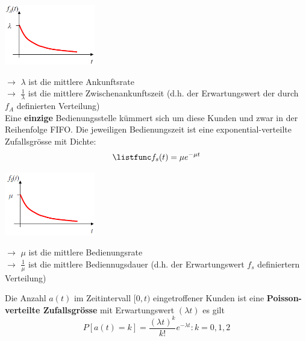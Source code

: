 \documentclass{report}
\newenvironment{Figure}
	{\par\medskip\noindent\minipage{\linewidth}}
	{\endminipage\par\medskip}
\theoremstyle{definition}
\theoremstyle{example}
\begin{document}
\begin{Figure}
\centering
\includegraphics[width=150px]{img/MM1Graph.png}
	\label{fig:Funktion MM1}
\end{Figure}
$\rightarrow$ $\lambda$ ist die mittlere Ankunftsrate \\
$\rightarrow$ $\frac{1}{\lambda}$ ist die mittlere Zwischenankunftszeit (d.h. der Erwartungswert der durch $f_A$ definierten Verteilung)\\

Eine \textbf{einzige} Bedienungsstelle kümmert sich um diese Kunden und zwar in der Reihenfolge FIFO. Die jeweiligen Bedienungszeit ist eine exponential-verteilte Zufallsgrösse mit Dichte:
\begin{equation}
   \listfunc f_s(t) = \mu e^{- \mu t}
\end{equation}

\begin{Figure}
\centering
\includegraphics[width=150px]{img/midBedienungsrate.png}
	\label{fig:Funktion mittlere Bedienungsrate}
\end{Figure}
$\rightarrow$ $\mu$ ist die mittlere Bedienungsrate\\
$\rightarrow$ $\frac{1}{\mu}$ ist die mittlere Bediennugsdauer (d.h. der Erwartungswert $f_s$ definiertern Verteilung)

Die Anzahl $a(t)$ im Zeitintervall $[0,t)$ eingetroffener Kunden ist eine \textbf{Poisson-verteilte Zufallsgrösse} mit Erwartungswert $(\lambda t)$ es gilt 
\begin{equation}
   P[a(t) = k] = \frac{(\lambda t)^k}{k!} e ^{- \lambda t} : k = 0,1,2
\end{equation}
\end{document}
